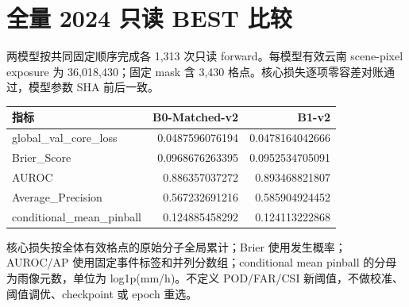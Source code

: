 \documentclass[UTF8,a4paper,11pt,fontset=windows]{ctexart}
\begin{document}
\section{全量 2024 只读 BEST 比较}
两模型按共同固定顺序完成各 1,313 次只读 forward。每模型有效云南 scene-pixel exposure 为 36,018,430；固定 mask 含 3,430 格点。核心损失逐项零容差对账通过，模型参数 SHA 前后一致。
\begin{tabular}{lrr}\toprule 指标 & B0-Matched-v2 & B1-v2\\\midrule
global\_val\_core\_loss & 0.0487596076194 & 0.0478164042666\\
Brier\_Score & 0.0968676263395 & 0.0952534705091\\
AUROC & 0.886357037272 & 0.893468821807\\
Average\_Precision & 0.567232691216 & 0.585904924452\\
conditional\_mean\_pinball & 0.124885458292 & 0.124113222868\\
\bottomrule\end{tabular}
核心损失按全体有效格点的原始分子全局累计；Brier 使用发生概率；AUROC/AP 使用固定事件标签和并列分数组；conditional mean pinball 的分母为雨像元数，单位为 log1p(mm/h)。不定义 POD/FAR/CSI 新阈值，不做校准、阈值调优、checkpoint 或 epoch 重选。
\end{document}
